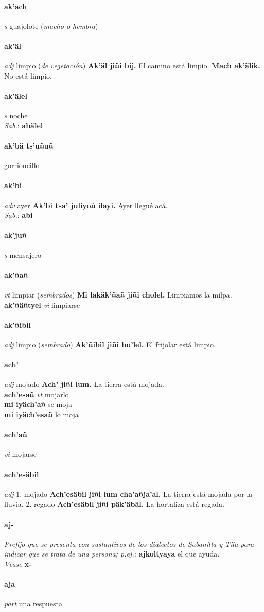 \documentclass{scrbook}
\newcommand{\entry}[1]{\paragraph{#1}}
\newcommand{\onedefinition}[1]{#1.}
\newcommand{\nontranslationdef}[1]{\textit{#1}}
\newcommand{\partofspeech}[1]{\textit{#1}}
\newcommand{\spanishtranslation}[1]{#1}
\newcommand{\clarification}[1]{(\textit{#1})}
\newcommand{\cholexample}[1]{\textbf{#1}}
\newcommand{\exampletranslation}[1]{#1}
\newcommand{\dialectvariant}[1]{\\\textit{#1}:}
\newcommand{\dialectword}[1]{\textbf{#1}}
\newcommand{\alsosee}[1]{\\\textit{Véase} \textbf{#1}}
\newcommand{\secondaryentry}[1]{\\\textbf{#1}}
\newcommand{\secondpartofspeech}[1]{\textit{#1}}
\newcommand{\secondtranslation}[1]{#1}
\begin{document}
\begin{multicols}{2}
\entry{ak'ach}
\partofspeech{s}
\spanishtranslation{guajolote}
\clarification{macho o hembra}

\entry{ak'äl}
\partofspeech{adj}
\spanishtranslation{limpio}
\clarification{de vegetación}
\cholexample{Ak'äl jiñi bij.}
\exampletranslation{El camino está limpio.}
\cholexample{Mach ak'älik.}
\exampletranslation{No está limpio.}

\entry{ak'älel}
\partofspeech{s}
\spanishtranslation{noche}
\dialectvariant{Sab.}
\dialectword{abälel}

\entry{ak'bä ts'uñuñ}
\spanishtranslation{gorrioncillo}

\entry{ak'bi}
\partofspeech{adv}
\spanishtranslation{ayer}
\cholexample{Ak'bi tsa' juliyoñ ilayi.}
\exampletranslation{Ayer llegué acá.}
\dialectvariant{Sab.}
\dialectword{abi}

\entry{ak'juñ}
\partofspeech{s}
\spanishtranslation{mensajero}

\entry{ak'ñañ}
\partofspeech{vt}
\spanishtranslation{limpiar}
\clarification{sembrados}
\cholexample{Mi lakäk'ñañ jiñi cholel.}
\exampletranslation{Limpiamos la milpa.}
\secondaryentry{ak'ñäñtyel}
\secondpartofspeech{vi}
\secondtranslation{limpiarse}

\entry{ak'ñibil}
\partofspeech{adj}
\spanishtranslation{limpio}
\clarification{sembrado}
\cholexample{Ak'ñibil jiñi bu'lel.}
\exampletranslation{El frijolar está limpio.}

\entry{ach'}
\partofspeech{adj}
\spanishtranslation{mojado}
\cholexample{Ach' jiñi lum.}
\exampletranslation{La tierra está mojada.}
\secondaryentry{ach'esañ}
\secondpartofspeech{vt}
\secondtranslation{mojarlo}
\secondaryentry{mi iyäch'añ}
\secondtranslation{se moja}
\secondaryentry{mi iyäch'esañ}
\secondtranslation{lo moja}

\entry{ach'añ}
\partofspeech{vi}
\spanishtranslation{mojarse}

\entry{ach'esäbil}
\partofspeech{adj}
\onedefinition{1}
\spanishtranslation{mojado}
\cholexample{Ach'esäbil jiñi lum cha'añja'al.}
\exampletranslation{La tierra está mojada por la lluvia.}
\onedefinition{2}
\spanishtranslation{regado}
\cholexample{Ach'esäbil jiñi päk'äbäl.}
\exampletranslation{La hortaliza está regada.}

\entry{aj-}
\nontranslationdef{Prefijo que se presenta con sustantivos de los dialectos de Sabanilla y Tila para indicar que se trata de una persona; p.ej.:}
\cholexample{ajkoltyaya}
\exampletranslation{el que ayuda.}
\alsosee{x-}

\entry{aja}
\partofspeech{part}
\spanishtranslation{una respuesta}


\end{multicols}
\end{document}
